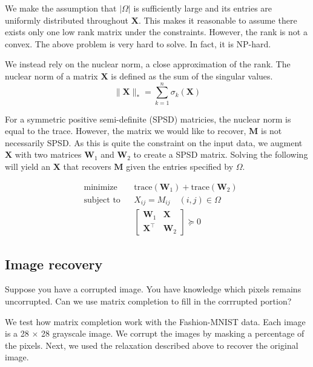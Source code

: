\documentclass{article}
\begin{document}
We make the assumption that $|\Omega|$ is sufficiently large and its entries are uniformly distributed throughout 
$\mathbf{X}$.
This makes it reasonable to assume there exists only one low rank matrix under the constraints. 
However, the rank is not a convex. The above problem is very hard to solve. In fact, it is NP-hard. 

We instead rely on the nuclear norm, a close approximation of the rank. The nuclear norm of a matrix $\mathbf{X}$ is defined as the sum of 
the singular values.
\[
\lVert \mathbf{X} \rVert_* = \sum_{k=1}^n \sigma_k ({\mathbf{X}})  
\]

For a symmetric positive semi-definite (SPSD) matricies, the nuclear norm is equal to the trace. 
However, the matrix we would like to recover, $\mathbf{M}$ is not necessarily SPSD.
As this is quite the constraint on the input data, we augment $\mathbf{X}$ with two matrices 
$\mathbf{W}_1$ and $\mathbf{W}_2$ to create a SPSD matrix. Solving the following will yield an 
$\mathbf{X}$ that recovers $\mathbf{M}$ given the entries specified by $\Omega$.

\begin{equation*}
  \begin{aligned}
  & {\text{minimize}}
  & & \text{trace}(\mathbf{W}_1) + \text{trace}(\mathbf{W}_2) \\[1pt]
  & \text{subject to}
  & & X_{ij} = M_{ij} \quad (i,j) \in \Omega\\[1pt]
  &&& \begin{bmatrix} 
    \mathbf{W}_1 & \mathbf{X} \\
    \mathbf{X}^\top & \mathbf{W}_2
  \end{bmatrix} \succeq 0 
  \end{aligned}
\end{equation*}


\subsection{Image recovery}

Suppose you have a corrupted image. You have knowledge which pixels remains uncorrupted. Can we use matrix completion to
fill in the corrrupted portion? 

We test how matrix completion work with the Fashion-MNIST data. Each image is a 28 $\times$ 28 grayscale image. 
We corrupt the images by masking a percentage of the pixels. Next, we used the relaxation described above to 
recover the original image. 
\end{document}
